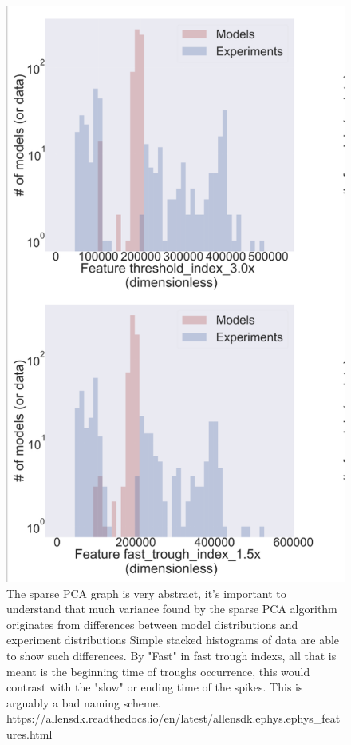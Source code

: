 \begin{figure}
    \centering
    \includegraphics[scale=0.75]{figures/features_that_disagree}
    \caption[Features that disagree. Slow Trough indexs, from the Allen cell types feature extraction]{The sparse PCA graph is very abstract, it's important to understand that much variance found by the sparse PCA algorithm originates from differences between model distributions and experiment distributions Simple stacked histograms of data are able to show such differences. By "Fast" in fast trough indexs, all that is meant is the beginning time of troughs occurrence, this would contrast with the "slow" or ending time of the spikes. This is arguably a bad naming scheme.
        https://allensdk.readthedocs.io/en/latest/allensdk.ephys.ephys_features.html
        }
        \label{fig:from_poster_disagree}
\end{figure}



